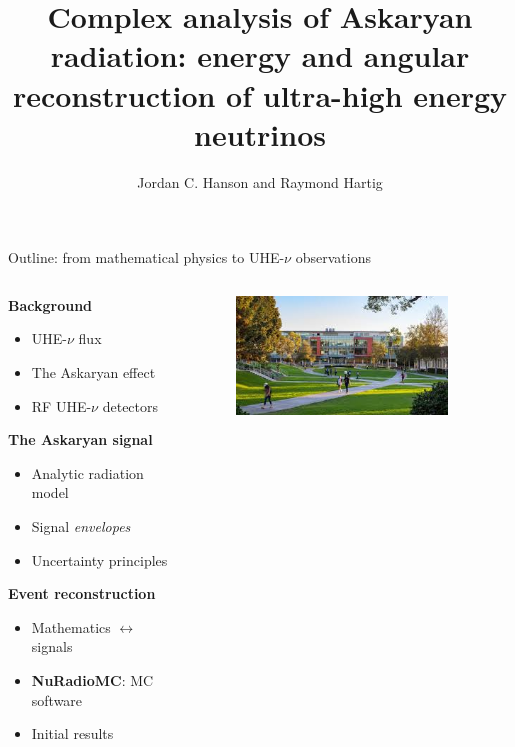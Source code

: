 \documentclass{beamer}
\title{Complex analysis of Askaryan radiation: energy and angular reconstruction of ultra-high energy neutrinos}
\author{Jordan C. Hanson and Raymond Hartig}
\institute{Dept. of Physics and Astronomy \\ Whittier College \\ Whittier, CA}
\begin{document}
\maketitle

\begin{frame}{Outline: from mathematical physics to UHE-$\nu$ observations}
\begin{columns}[T]
\begin{column}{0.5\textwidth}
\textbf{\alert{Background}}
\begin{itemize}
\item UHE-$\nu$ flux
\item The Askaryan effect
\item RF UHE-$\nu$ detectors
\end{itemize}
\textbf{\alert{The Askaryan signal}}
\begin{itemize}
\item Analytic radiation model
\item Signal \textit{envelopes}
\item Uncertainty principles
\end{itemize}
\textbf{\alert{Event reconstruction}}
\begin{itemize}
\item Mathematics $\leftrightarrow$ signals
\item \textbf{NuRadioMC}: MC software
\item Initial results
\end{itemize}
\end{column}
\begin{column}{0.5\textwidth}
\begin{figure}
\centering
\includegraphics[width=0.9\textwidth]{whittier3.jpeg}

\end{figure}
\end{column}
\end{columns}
\end{frame}
\end{document}
